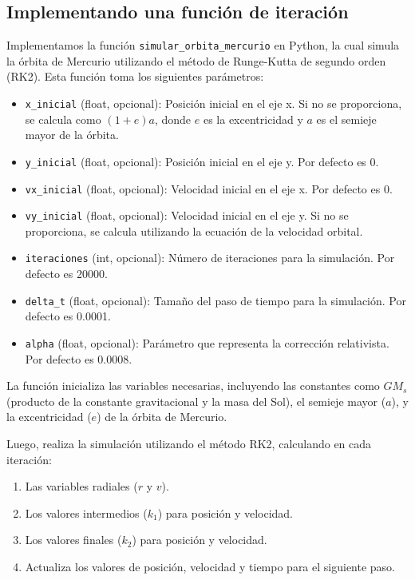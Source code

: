 \documentclass[twocolumn]{article}
\begin{document}
\subsection{Implementando una función de iteración}

Implementamos la función \texttt{simular\_orbita\_mercurio} en Python, la cual simula la órbita de Mercurio utilizando el método de Runge-Kutta de segundo orden (RK2). Esta función toma los siguientes parámetros:

\begin{itemize}
    \item \texttt{x\_inicial} (float, opcional): Posición inicial en el eje x. Si no se proporciona, se calcula como $(1+e)a$, donde $e$ es la excentricidad y $a$ es el semieje mayor de la órbita.
    \item \texttt{y\_inicial} (float, opcional): Posición inicial en el eje y. Por defecto es 0.
    \item \texttt{vx\_inicial} (float, opcional): Velocidad inicial en el eje x. Por defecto es 0.
    \item \texttt{vy\_inicial} (float, opcional): Velocidad inicial en el eje y. Si no se proporciona, se calcula utilizando la ecuación de la velocidad orbital.
    \item \texttt{iteraciones} (int, opcional): Número de iteraciones para la simulación. Por defecto es 20000.
    \item \texttt{delta\_t} (float, opcional): Tamaño del paso de tiempo para la simulación. Por defecto es 0.0001.
    \item \texttt{alpha} (float, opcional): Parámetro que representa la corrección relativista. Por defecto es 0.0008.
\end{itemize}

La función inicializa las variables necesarias, incluyendo las constantes como $GM_s$ (producto de la constante gravitacional y la masa del Sol), el semieje mayor ($a$), y la excentricidad ($e$) de la órbita de Mercurio.

Luego, realiza la simulación utilizando el método RK2, calculando en cada iteración:
\begin{enumerate}
    \item Las variables radiales ($r$ y $v$).
    \item Los valores intermedios ($k_1$) para posición y velocidad.
    \item Los valores finales ($k_2$) para posición y velocidad.
    \item Actualiza los valores de posición, velocidad y tiempo para el siguiente paso.
\end{enumerate}
\end{document}
